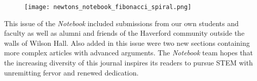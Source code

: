 \documentclass[12pt]{article}
\theoremstyle{definition}
\begin{document}
\newpage

\def\currentTitleWallpaper{2020_Philosophy_Title_Page_Border.pdf}




\newpage



\newpage

\def\currentTitleWallpaper{2020_Applied_Math_Title_Page_Border.pdf}




\newpage



\newpage



\newpage

\def\currentTitleWallpaper{2020_Applied_Science_Title_Page_Border.pdf}




\newpage



\newpage



\newpage


\begin{figure}[H]
    \centering
    \vspace*{50pt}
    \texttt{[image: newtons\_notebook\_fibonacci\_spiral.png]}
    \vspace*{25pt}
\end{figure}

    This issue of the \textit{Notebook} included submissions from our own students and faculty as well as alumni and friends of the Haverford community outside the walls of Wilson Hall. Also added in this issue were two new sections containing more complex articles with advanced arguments. The \textit{Notebook} team hopes that the increasing diversity of this journal inspires its readers to pursue STEM with unremitting fervor and renewed dedication. 
\end{document}
